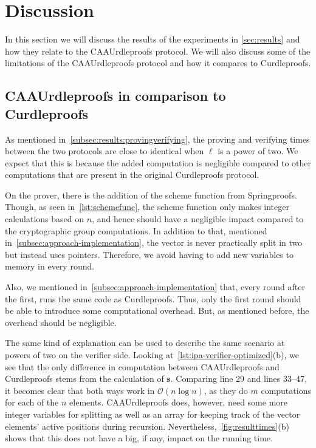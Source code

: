 

\section{Discussion}\label{sec:discussion}
In this section we will discuss the results of the experiments in \autoref{sec:results} and how they relate to the CAAUrdleproofs protocol.
We will also discuss some of the limitations of the CAAUrdleproofs protocol and how it compares to Curdleproofs.


\subsection{CAAUrdleproofs in comparison to Curdleproofs}\label{subsec:CAAUrdleproofs-vs-Curdleproofs}
As mentioned in~\autoref{subsec:results:provingverifying}, the proving and verifying times between the two protocols are close to identical when $\ell$ is a power of two.
We expect that this is because the added computation is negligible compared to other computations that are present in the original Curdleproofs protocol.

On the prover, there is the addition of the scheme function from Springproofs.
Though, as seen in~\autoref{lst:schemefunc}, the scheme function only makes integer calculations based on $n$, and hence should have a negligible impact compared to the cryptographic group computations.
In addition to that, mentioned in~\autoref{subsec:approach-implementation}, the vector is never practically split in two but instead uses pointers.
Therefore, we avoid having to add new variables to memory in every round.

Also, we mentioned in~\autoref{subsec:approach-implementation} that, every round after the first, runs the same code as Curdleproofs.
Thus, only the first round should be able to introduce some computational overhead.
But, as mentioned before, the overhead should be negligible.

The same kind of explanation can be used to describe the same scenario at powers of two on the verifier side.
Looking at~\autoref{lst:ipa-verifier-optimized}(b), we see that the only difference in computation between CAAUrdleproofs and Curdleproofs stems from the calculation of $\mathbf{s}$.
Comparing line 29 and lines 33--47, it becomes clear that both ways work in $\mathcal{O}(n\log n)$, as they do $m$ computations for each of the $n$ elements.
CAAUrdleproofs does, however, need some more integer variables for splitting as well as an array for keeping track of the vector elements' active positions during recursion.
Nevertheless,~\autoref{fig:resulttimes}(b) shows that this does not have a big, if any, impact on the running time.

